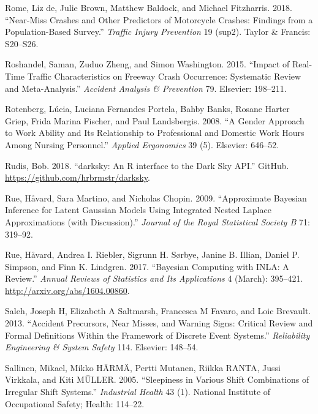 \documentclass[12pt]{book}
\numberwithin{equation}{chapter}
\begin{document}
\leavevmode\hypertarget{ref-de2018near}{}%
Rome, Liz de, Julie Brown, Matthew Baldock, and Michael Fitzharris. 2018. ``Near-Miss Crashes and Other Predictors of Motorcycle Crashes: Findings from a Population-Based Survey.'' \emph{Traffic Injury Prevention} 19 (sup2). Taylor \& Francis: S20--S26.

\leavevmode\hypertarget{ref-roshandel2015impact}{}%
Roshandel, Saman, Zuduo Zheng, and Simon Washington. 2015. ``Impact of Real-Time Traffic Characteristics on Freeway Crash Occurrence: Systematic Review and Meta-Analysis.'' \emph{Accident Analysis \& Prevention} 79. Elsevier: 198--211.

\leavevmode\hypertarget{ref-rotenberg2008gender}{}%
Rotenberg, Lúcia, Luciana Fernandes Portela, Bahby Banks, Rosane Harter Griep, Frida Marina Fischer, and Paul Landsbergis. 2008. ``A Gender Approach to Work Ability and Its Relationship to Professional and Domestic Work Hours Among Nursing Personnel.'' \emph{Applied Ergonomics} 39 (5). Elsevier: 646--52.

\leavevmode\hypertarget{ref-hrbrmstr}{}%
Rudis, Bob. 2018. ``darksky: An R interface to the Dark Sky API.'' GitHub. \url{https://github.com/hrbrmstr/darksky}.

\leavevmode\hypertarget{ref-Havard2009}{}%
Rue, Håvard, Sara Martino, and Nicholas Chopin. 2009. ``Approximate Bayesian Inference for Latent Gaussian Models Using Integrated Nested Laplace Approximations (with Discussion).'' \emph{Journal of the Royal Statistical Society B} 71: 319--92.

\leavevmode\hypertarget{ref-Rue2017}{}%
Rue, Håvard, Andrea I. Riebler, Sigrunn H. Sørbye, Janine B. Illian, Daniel P. Simpson, and Finn K. Lindgren. 2017. ``Bayesian Computing with INLA: A Review.'' \emph{Annual Reviews of Statistics and Its Applications} 4 (March): 395--421. \url{http://arxiv.org/abs/1604.00860}.

\leavevmode\hypertarget{ref-saleh2013accident}{}%
Saleh, Joseph H, Elizabeth A Saltmarsh, Francesca M Favaro, and Loic Brevault. 2013. ``Accident Precursors, Near Misses, and Warning Signs: Critical Review and Formal Definitions Within the Framework of Discrete Event Systems.'' \emph{Reliability Engineering \& System Safety} 114. Elsevier: 148--54.

\leavevmode\hypertarget{ref-sallinen2005sleepiness}{}%
Sallinen, Mikael, Mikko HÄRMÄ, Pertti Mutanen, Riikka RANTA, Jussi Virkkala, and Kiti MÜLLER. 2005. ``Sleepiness in Various Shift Combinations of Irregular Shift Systems.'' \emph{Industrial Health} 43 (1). National Institute of Occupational Safety; Health: 114--22.
\end{document}
